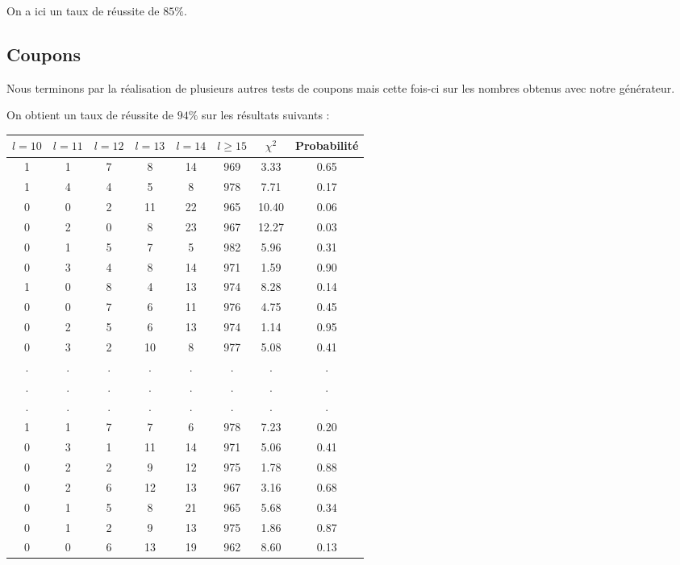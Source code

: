 \documentclass[12pt,a4paper]{article}
\begin{document}
On a ici un taux de réussite de $85\%$.

\newpage
\subsection{Coupons}

Nous terminons par la réalisation de plusieurs autres tests de coupons mais
cette fois-ci sur les nombres obtenus avec notre générateur.

On obtient un taux de réussite de $94\%$ sur les résultats suivants :

\begin{center}
\begin{tabular}{|c|c|c|c|c|c|c|c|}
\hline
$l = 10$ & $l = 11$ & $l = 12$ & $l = 13$ & $l = 14$ & $l \geq 15$ & $\chi^2$ & Probabilité \\ \hline
1 & 1 & 7 & 8 & 14 & 969 &  3.33 &  0.65\\ \hline
1 & 4 & 4 & 5 & 8 & 978 &  7.71 &  0.17\\ \hline
0 & 0 & 2 & 11 & 22 & 965 & 10.40 &  0.06\\ \hline
0 & 2 & 0 & 8 & 23 & 967 & 12.27 &  0.03\\ \hline
0 & 1 & 5 & 7 & 5 & 982 &  5.96 &  0.31\\ \hline
0 & 3 & 4 & 8 & 14 & 971 &  1.59 &  0.90\\ \hline
1 & 0 & 8 & 4 & 13 & 974 &  8.28 &  0.14\\ \hline
0 & 0 & 7 & 6 & 11 & 976 &  4.75 &  0.45\\ \hline
0 & 2 & 5 & 6 & 13 & 974 &  1.14 &  0.95\\ \hline
0 & 3 & 2 & 10 & 8 & 977 &  5.08 &  0.41\\ \hline
 . & . & . & . & . & . & . & .\\ \hline
 . & . & . & . & . & . & . & .\\ \hline
 . & . & . & . & . & . & . & .\\ \hline
1 & 1 & 7 & 7 & 6 & 978 &  7.23 &  0.20\\ \hline
0 & 3 & 1 & 11 & 14 & 971 &  5.06 &  0.41\\ \hline
0 & 2 & 2 & 9 & 12 & 975 &  1.78 &  0.88\\ \hline
0 & 2 & 6 & 12 & 13 & 967 &  3.16 &  0.68\\ \hline
0 & 1 & 5 & 8 & 21 & 965 &  5.68 &  0.34\\ \hline
0 & 1 & 2 & 9 & 13 & 975 &  1.86 &  0.87\\ \hline
0 & 0 & 6 & 13 & 19 & 962 &  8.60 &  0.13\\ \hline

\end{tabular}
\end{center}
\end{document}
